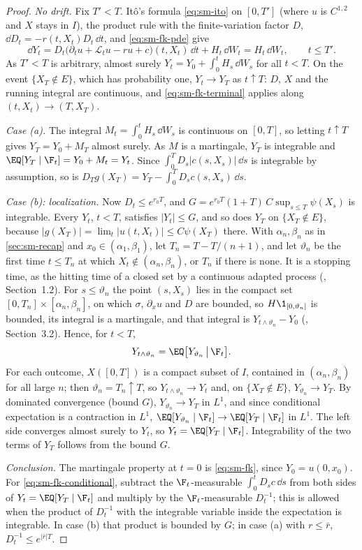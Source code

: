 \begin{proof}
\emph{No drift.} Fix $T'<T$. It\^o's formula \eqref{eq:sm-ito} on $[0,T']$ (where $u$ is $C^{1,2}$
and $X$ stays in $I$), the product rule with the finite-variation factor $D$, $\dd D_t=-r(t,X_t)D_t\,\dd t$,
and \eqref{eq:sm-fk-pde} give
\[
  \dd Y_t=D_t\big(\partial_tu+\mathcal L_tu-ru+c\big)(t,X_t)\,\dd t+H_t\,\dd W_t=H_t\,\dd W_t,\qquad t\le T'.
\]
As $T'<T$ is arbitrary, almost surely $Y_t=Y_0+\int_0^tH_s\,\dd W_s$ for all $t<T$. On the event
$\{X_T\notin E\}$, which has probability one, $Y_t\to Y_T$ as $t\uparrow T$: $D$, $X$ and the
running integral are continuous, and \eqref{eq:sm-fk-terminal} applies along $(t,X_t)\to(T,X_T)$.

\emph{Case (a).} The integral $M_t=\int_0^tH_s\,\dd W_s$ is continuous on $[0,T]$, so letting
$t\uparrow T$ gives $Y_T=Y_0+M_T$ almost surely. As $M$ is a martingale, $Y_T$ is integrable and
$\EQ[Y_T\mid\F_t]=Y_0+M_t=Y_t$. Since $\int_0^TD_s|c(s,X_s)|\,\dd s$ is integrable by assumption,
so is $D_Tg(X_T)=Y_T-\int_0^TD_sc(s,X_s)\,\dd s$.

\emph{Case (b): localization.} Now $D_t\le e^{r_0T}$, and
$G=e^{r_0T}(1+T)\,C\sup_{s\le T}\psi(X_s)$ is integrable. Every $Y_t$, $t<T$, satisfies $|Y_t|\le G$,
and so does $Y_T$ on $\{X_T\notin E\}$, because $|g(X_T)|=\lim_t|u(t,X_t)|\le C\psi(X_T)$ there.
With $\alpha_n,\beta_n$ as in \cref{sec:sm-recap} and $x_0\in(\alpha_1,\beta_1)$, let $T_n=T-T/(n+1)$, and let $\vartheta_n$ be the first time
$t\le T_n$ at which $X_t\notin(\alpha_n,\beta_n)$, or $T_n$ if there is none. It is a stopping
time, as the hitting time of a closed set by a continuous adapted process
(\textcite{karatzas-shreve}, Section~1.2). For $s\le\vartheta_n$ the point $(s,X_s)$ lies in the
compact set $[0,T_n]\times[\alpha_n,\beta_n]$, on which $\sigma$, $\partial_xu$ and $D$ are bounded,
so $H\1_{[0,\vartheta_n]}$ is bounded, its integral is a martingale, and that integral is
$Y_{t\wedge\vartheta_n}-Y_0$ (\textcite{karatzas-shreve}, Section~3.2). Hence, for $t<T$,
\[
  Y_{t\wedge\vartheta_n}=\EQ\big[Y_{\vartheta_n}\,\big|\,\F_t\big].
\]
For each outcome, $X([0,T])$ is a compact subset of $I$, contained in $(\alpha_n,\beta_n)$ for all
large $n$; then $\vartheta_n=T_n\uparrow T$, so $Y_{t\wedge\vartheta_n}\to Y_t$ and, on
$\{X_T\notin E\}$, $Y_{\vartheta_n}\to Y_T$. By dominated convergence (bound $G$),
$Y_{\vartheta_n}\to Y_T$ in $L^1$, and since conditional expectation is a contraction in $L^1$,
$\EQ[Y_{\vartheta_n}\mid\F_t]\to\EQ[Y_T\mid\F_t]$ in $L^1$. The left side converges almost surely
to $Y_t$, so $Y_t=\EQ[Y_T\mid\F_t]$. Integrability of the two terms of $Y_T$ follows from the bound $G$.

\emph{Conclusion.} The martingale property at $t=0$ is \eqref{eq:sm-fk}, since $Y_0=u(0,x_0)$. For
\eqref{eq:sm-fk-conditional}, subtract the $\F_t$-measurable $\int_0^tD_sc\,\dd s$ from both sides
of $Y_t=\EQ[Y_T\mid\F_t]$ and multiply by the $\F_t$-measurable $D_t^{-1}$; this is allowed when
the product of $D_t^{-1}$ with the integrable variable inside the expectation is integrable. In
case (b) that product is bounded by $G$; in case (a) with $r\le\bar r$, $D_t^{-1}\le e^{|\bar r|T}$.
\end{proof}

